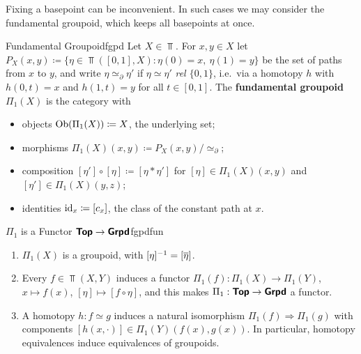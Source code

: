 Fixing a basepoint can be inconvenient. In such cases we may consider the fundamental groupoid, which keeps all basepoints at once.

\begin{definition}{Fundamental Groupoid}{fgpd}
  Let $X\in\Top$. For $x,y\in X$ let $P_X(x,y)\coloneq\{\eta\in\Top([0,1],X) : \eta(0)=x,\ \eta(1)=y\}$ be the set of paths from $x$ to $y$, and write $\eta\simeq_\partial\eta'$ if $\eta\simeq\eta'$ \emph{rel $\{0,1\}$}, i.e.\ via a homotopy $h$ with $h(0,t)=x$ and $h(1,t)=y$ for all $t\in[0,1]$. The \textbf{fundamental groupoid} $\Pi_1(X)$ is the category with
  \begin{itemize}
    \item objects $\operatorname{Ob}(\Pi_1(X))\coloneq X$, the underlying set;
    \item morphisms $\Pi_1(X)(x,y)\coloneq P_X(x,y)/\simeq_\partial$;
    \item composition $[\eta']\circ[\eta]\coloneq[\eta\ast\eta']$ for $[\eta]\in\Pi_1(X)(x,y)$ and $[\eta']\in\Pi_1(X)(y,z)$;
    \item identities $\operatorname{id}_x\coloneq[c_x]$, the class of the constant path at $x$.
  \end{itemize}
\end{definition}

\begin{proposition}{$\Pi_1$ is a Functor $\bm{\mathsf{Top}}\to\bm{\mathsf{Grpd}}$}{fgpdfun}
  \begin{enumerate}
    \item $\Pi_1(X)$ is a groupoid, with $[\eta]^{-1}=[\overline\eta]$.
    \item Every $f\in\Top(X,Y)$ induces a functor $\Pi_1(f):\Pi_1(X)\to\Pi_1(Y)$, $x\mapsto f(x)$, $[\eta]\mapsto[f\circ\eta]$, and this makes $\Pi_1:\bm{\mathsf{Top}}\to\bm{\mathsf{Grpd}}$ a functor.
    \item A homotopy $h:f\simeq g$ induces a natural isomorphism $\Pi_1(f)\Rightarrow\Pi_1(g)$ with components $[h(x,\cdot)]\in\Pi_1(Y)(f(x),g(x))$. In particular, homotopy equivalences induce equivalences of groupoids.
  \end{enumerate}
\end{proposition}

